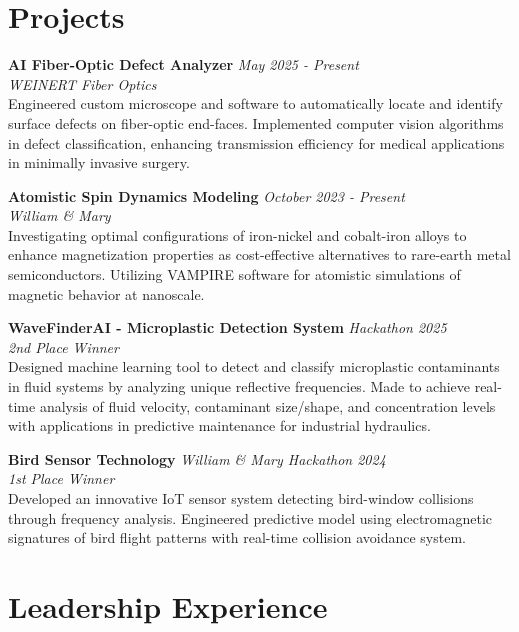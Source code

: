 \documentclass[11pt,letterpaper]{article}
\newcommand{\daterange}[1]{\textit{\color{secondary}#1}}
\newcommand{\organization}[1]{\textit{#1}}
\begin{document}
\section{Projects}

\noindent
\textbf{AI Fiber-Optic Defect Analyzer} \hfill \daterange{May 2025 - Present}\\
\organization{WEINERT Fiber Optics}\\
Engineered custom microscope and software to automatically locate and identify surface defects on fiber-optic end-faces. Implemented computer vision algorithms in defect classification, enhancing transmission efficiency for medical applications in minimally invasive surgery.

\vspace{6pt}
\noindent
\textbf{Atomistic Spin Dynamics Modeling} \hfill \daterange{October 2023 - Present}\\
\organization{William \& Mary}\\
Investigating optimal configurations of iron-nickel and cobalt-iron alloys to enhance magnetization properties as cost-effective alternatives to rare-earth metal semiconductors. Utilizing VAMPIRE software for atomistic simulations of magnetic behavior at nanoscale.

\vspace{6pt}
\noindent
\textbf{WaveFinderAI - Microplastic Detection System} \hfill \daterange{Hackathon 2025}\\
\organization{2nd Place Winner}\\
Designed machine learning tool to detect and classify microplastic contaminants in fluid systems by analyzing unique reflective frequencies. Made to achieve real-time analysis of fluid velocity, contaminant size/shape, and concentration levels with applications in predictive maintenance for industrial hydraulics.

\vspace{6pt}
\noindent
\textbf{Bird Sensor Technology} \hfill \daterange{William \& Mary Hackathon 2024}\\
\organization{1st Place Winner}\\
Developed an innovative IoT sensor system detecting bird-window collisions through frequency analysis. Engineered predictive model using electromagnetic signatures of bird flight patterns with real-time collision avoidance system.

\section{Leadership Experience}
\end{document}
